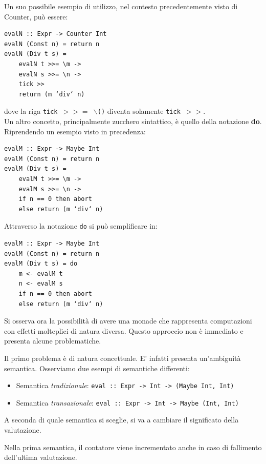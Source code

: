 \documentclass{article}
\begin{document}
Un suo possibile esempio di utilizzo, nel contesto precedentemente visto di Counter, può essere:
\begin{tcolorbox}
\begin{verbatim}
evalN :: Expr -> Counter Int
evalN (Const n) = return n
evalN (Div t s) =
    evalN t >>= \m ->
    evalN s >>= \n ->
    tick >>
    return (m ‘div‘ n)
\end{verbatim}
\end{tcolorbox}
dove la riga \texttt{tick $>>=$ $\backslash$()} diventa solamente \texttt{tick $>>$}.\vspace{14pt}\\
Un altro concetto, principalmente zucchero sintattico, è quello della notazione \textbf{do}. Riprendendo un esempio visto in precedenza:
\begin{tcolorbox}
\begin{verbatim}
evalM :: Expr -> Maybe Int
evalM (Const n) = return n
evalM (Div t s) =
    evalM t >>= \m ->
    evalM s >>= \n ->
    if n == 0 then abort
    else return (m ‘div‘ n)
\end{verbatim}
\end{tcolorbox}
Attraverso la notazione \texttt{do} si può semplificare in:
\begin{tcolorbox}
\begin{verbatim}
evalM :: Expr -> Maybe Int
evalM (Const n) = return n
evalM (Div t s) = do
    m <- evalM t
    n <- evalM s
    if n == 0 then abort
    else return (m ‘div‘ n)
\end{verbatim}
\end{tcolorbox}
\vspace{14pt}
Si osserva ora la possibilità di avere una monade che rappresenta computazioni con effetti molteplici di natura diversa. Questo approccio non è immediato e presenta alcune problematiche.

Il primo problema è di natura concettuale. E' infatti presenta un'ambiguità semantica. Osserviamo due esempi di semantiche differenti:
\begin{itemize}
    \item Semantica \textit{tradizionale}: \texttt{eval :: Expr -> Int -> (Maybe Int, Int)}
    \item Semantica \textit{transazionale}: \texttt{eval :: Expr -> Int -> Maybe (Int, Int)}
\end{itemize}
A seconda di quale semantica si sceglie, si va a cambiare il significato della valutazione.

Nella prima semantica, il contatore viene incrementato anche in caso di fallimento dell'ultima valutazione.
\end{document}
